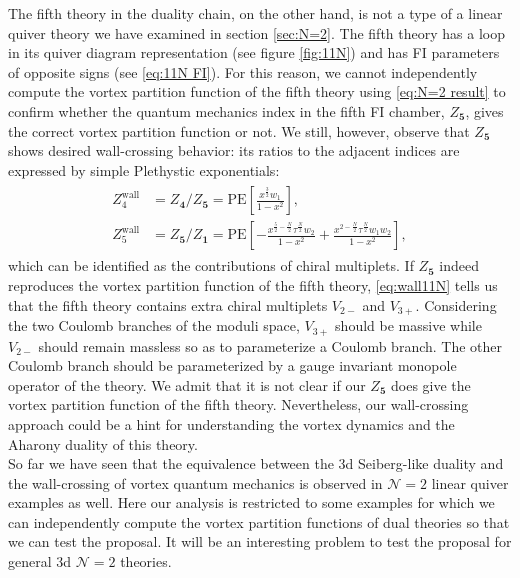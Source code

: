\documentclass[a4paper,11pt]{article}
\begin{document}
The fifth theory in the duality chain, on the other hand, is not a type of a linear quiver theory we have examined in section \ref{sec:N=2}. The fifth theory has a loop in its quiver diagram representation (see figure \ref{fig:11N}) and has FI parameters of opposite signs (see \eqref{eq:11N FI}). For this reason, we cannot independently compute the vortex partition function of the fifth theory using \eqref{eq:N=2 result} to confirm whether the quantum mechanics index in the fifth FI chamber, $Z_{\mathbf 5}$, gives the correct vortex partition function or not. We still, however, observe that $Z_{\mathbf 5}$ shows desired wall-crossing behavior: its ratios to the adjacent indices are expressed by simple Plethystic exponentials:
\begin{align}
\begin{aligned}
\label{eq:wall11N}
Z^\text{wall}_4 &= Z_{\mathbf 4}/Z_{\mathbf 5} = \mathrm{PE} \left[\frac{x^{\frac{3}{2}} w_1}{1-x^2}\right], \\
Z^\text{wall}_5 &= Z_{\mathbf 5}/Z_{\mathbf 1} = \mathrm{PE} \left[-\frac{x^{\frac{5}{2}-\frac{N}{2}} \tau^{\frac{N}{2}} w_2}{1-x^2}+\frac{x^{2-\frac{N}{2}} \tau^{\frac{N}{2}} w_1 w_2}{1-x^2}\right],
\end{aligned}
\end{align}
which can be identified as the contributions of chiral multiplets. If $Z_{\mathbf 5}$ indeed reproduces the vortex partition function of the fifth theory, \eqref{eq:wall11N} tells us that the fifth theory contains extra chiral multiplets $V_{2-}$ and $V_{3+}$. Considering the two Coulomb branches of the moduli space, $V_{3+}$ should be massive while $V_{2-}$ should remain massless so as to parameterize a Coulomb branch. The other Coulomb branch should be parameterized by a gauge invariant monopole operator of the theory. We admit that it is not clear if our $Z_{\mathbf 5}$ does give the vortex partition function of the fifth theory. Nevertheless, our wall-crossing approach could be a hint for understanding the vortex dynamics and the Aharony duality of this theory.
\\


So far we have seen that the equivalence between the 3d Seiberg-like duality and the wall-crossing of vortex quantum mechanics is observed in $\mathcal N = 2$ linear quiver examples as well. Here our analysis is restricted to some examples for which we can independently compute the vortex partition functions of dual theories so that we can test the proposal. It will be an interesting problem to test the proposal for general 3d $\mathcal N = 2$ theories.
\end{document}
